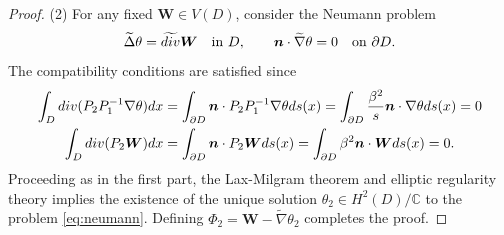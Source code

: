 \documentclass[10pt,a4paper]{amsart}
\newcommand{\C}{{\mat C}}
\newcommand{\bs}{\boldsymbol}
\newcommand{\dive}{{\rm div}}
\newcommand{\mat}{\mathbb}
\newcommand{\pa}{\partial}
\newcommand{\wid}{\widetilde}
\begin{document}
\begin{proof}
(2) For any fixed $\bs{W}\in V(D)$, consider the Neumann problem
\begin{equation}\label{eq:neumann}
\wid{\Delta}\theta=\wid{\dive}\bs{W} \quad\text{in } D, \qquad \bs{n}\cdot \wid{\nabla}\theta=0 
\quad\text{on } \pa D.
\end{equation}
The compatibility conditions are satisfied since
\begin{equation*}
\begin{aligned}
\int_{D}\dive(P_2P_1^{-1}\nabla\theta)dx &=\int_{\pa D}\bs{n}\cdot P_2P_1^{-1}\nabla\theta ds(x)= 
\int_{\pa D}\frac{\beta^2}{s}\bs{n}\cdot \nabla\theta ds(x)=0\\
\int_{D}\dive(P_2\bs{W})dx&=\int_{\pa D}\bs{n}\cdot P_2\bs{W}ds(x)= \int_{\pa D}\beta^2\bs{n}\cdot\bs{W}ds(x)=0.
\end{aligned}
\end{equation*}
Proceeding as in the first part, the Lax-Milgram theorem and elliptic regularity theory implies the 
 existence of the unique solution
$\theta_2 \in H^2(D)/\C$ to the problem \eqref{eq:neumann}. Defining $\Phi_2 = \bs{W} - \wid{\nabla}\theta_2$ 
completes the proof.
\end{proof}
\end{document}
